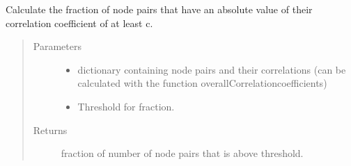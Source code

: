 \documentclass[letterpaper,10pt,english]{sphinxmanual}
\begin{document}

\begin{fulllineitems}
\label{\detokenize{clustering:clustering.nodepairFraction}}
\sphinxAtStartPar
Calculate the fraction of node pairs that have an absolute value of their correlation coefficient of at least c.
\begin{quote}\begin{description}
\item[{Parameters}] \leavevmode\begin{itemize}
\item {} 
\sphinxAtStartPar
{} \textendash{} dictionary containing node pairs and their correlations (can be calculated with the function overallCorrelationcoefficients)

\item {} 
\sphinxAtStartPar
{} \textendash{} Threshold for fraction.

\end{itemize}

\item[{Returns}] \leavevmode
\sphinxAtStartPar
fraction of number of node pairs that is above threshold.

\end{description}\end{quote}

\end{fulllineitems}

\end{document}
